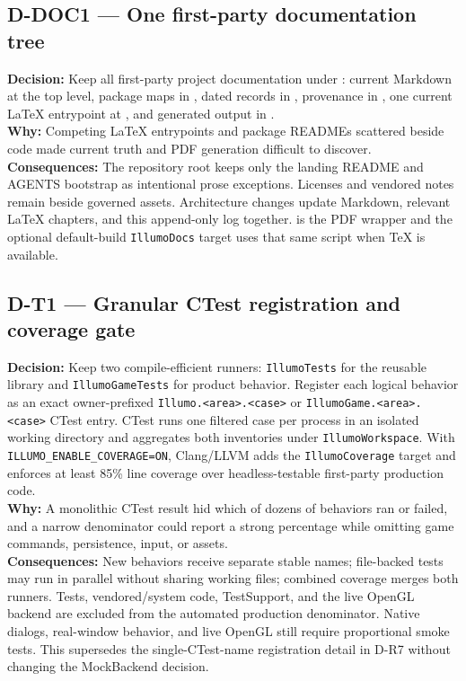 \subsection*{D-DOC1 --- One first-party documentation tree}
\begin{decisionbox}[title={D-DOC1 \quad 2026-08-04}]
\textbf{Decision:} Keep all first-party project documentation under
: current Markdown at the top level, package maps in
, dated records in , provenance in
, one current LaTeX entrypoint at ,
and generated output in .\\
\textbf{Why:} Competing LaTeX entrypoints and package READMEs scattered beside
code made current truth and PDF generation difficult to discover.\\
\textbf{Consequences:} The repository root keeps only the landing README and
AGENTS bootstrap as intentional prose exceptions. Licenses and vendored notes
remain beside governed assets. Architecture changes update Markdown, relevant
LaTeX chapters, and this append-only log together. 
is the PDF wrapper and the optional default-build \texttt{IllumoDocs} target
uses that same script when TeX is available.
\end{decisionbox}

\subsection*{D-T1 --- Granular CTest registration and coverage gate}
\begin{decisionbox}[title={D-T1 \quad 2026-08-04}]
\textbf{Decision:} Keep two compile-efficient runners: \texttt{IllumoTests}
for the reusable library and \texttt{IllumoGameTests} for product behavior.
Register each logical behavior as an exact owner-prefixed
\texttt{Illumo.<area>.<case>} or \texttt{IllumoGame.<area>.<case>} CTest entry.
CTest runs one filtered case per process in an isolated working directory and
aggregates both inventories under \texttt{IllumoWorkspace}. With
\texttt{ILLUMO\_ENABLE\_COVERAGE=ON}, Clang/LLVM adds the
\texttt{IllumoCoverage} target and enforces at least 85\% line coverage over
headless-testable first-party production code.\\
\textbf{Why:} A monolithic CTest result hid which of dozens of behaviors ran or
failed, and a narrow denominator could report a strong percentage while omitting
game commands, persistence, input, or assets.\\
\textbf{Consequences:} New behaviors receive separate stable names; file-backed
tests may run in parallel without sharing working files; combined coverage
merges both runners. Tests, vendored/system code, TestSupport, and the live
OpenGL backend are excluded from the automated production denominator. Native
dialogs, real-window behavior, and live OpenGL still require proportional smoke
tests. This supersedes the single-CTest-name registration detail in D-R7
without changing the MockBackend decision.
\end{decisionbox}

